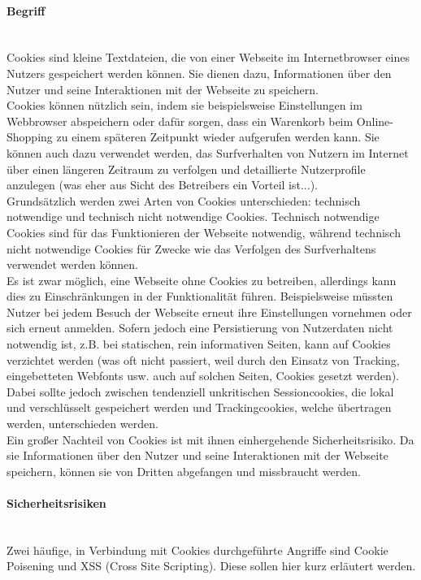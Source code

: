 \documentclass[notitlepage, hidelinks]{article}
\begin{document}
\paragraph{Begriff} \mbox{} \\
Cookies sind kleine Textdateien, die von einer Webseite im Internetbrowser eines Nutzers gespeichert werden können. Sie dienen dazu, Informationen über den Nutzer und seine Interaktionen mit der Webseite zu speichern. \\
Cookies können nützlich sein, indem sie beispielsweise Einstellungen im Webbrowser abspeichern oder dafür sorgen, dass ein Warenkorb beim Online-Shopping zu einem späteren Zeitpunkt wieder aufgerufen werden kann. Sie können auch dazu verwendet werden, das Surfverhalten von Nutzern im Internet über einen längeren Zeitraum zu verfolgen und detaillierte Nutzerprofile anzulegen (was eher aus Sicht des Betreibers ein Vorteil ist...). \\
Grundsätzlich werden zwei Arten von Cookies unterschieden: technisch notwendige und technisch nicht notwendige Cookies. Technisch notwendige Cookies sind für das Funktionieren der Webseite notwendig, während technisch nicht notwendige Cookies für Zwecke wie das Verfolgen des Surfverhaltens verwendet werden können. \\
Es ist zwar möglich, eine Webseite ohne Cookies zu betreiben, allerdings kann dies zu Einschränkungen in der Funktionalität führen. Beispielsweise müssten Nutzer bei jedem Besuch der Webseite erneut ihre Einstellungen vornehmen oder sich erneut anmelden. Sofern jedoch eine Persistierung von Nutzerdaten nicht notwendig ist, z.B. bei statischen, rein informativen Seiten, kann auf Cookies verzichtet werden (was oft nicht passiert, weil durch den Einsatz von Tracking, eingebetteten Webfonts usw. auch auf solchen Seiten, Cookies gesetzt werden). Dabei sollte jedoch zwischen tendenziell unkritischen Sessioncookies, die lokal und verschlüsselt gespeichert werden und Trackingcookies, welche übertragen werden, unterschieden werden.   \\  
Ein großer Nachteil von Cookies ist mit ihnen einhergehende Sicherheitsrisiko. Da sie Informationen über den Nutzer und seine Interaktionen mit der Webseite speichern, können sie von Dritten abgefangen und missbraucht werden.

\paragraph{Sicherheitsrisiken} \mbox{} \\
Zwei häufige, in Verbindung mit Cookies durchgeführte Angriffe sind Cookie Poisening und XSS (Cross Site Scripting). Diese sollen hier kurz erläutert werden. \\
\end{document}
